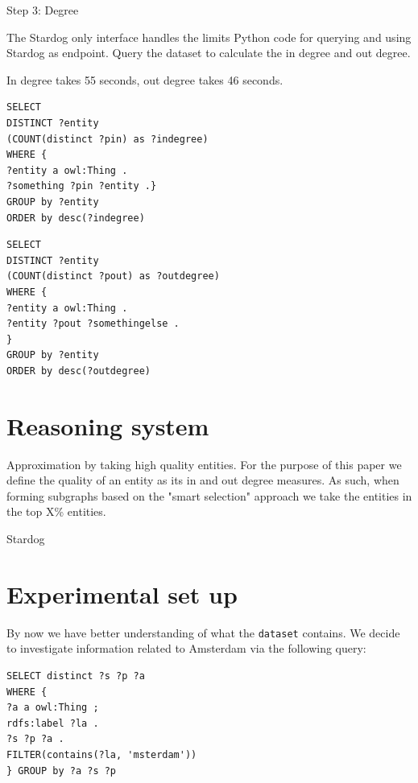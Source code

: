 \documentclass[runningheads,a4paper]{../../StyleFiles/llncs}
\begin{document}
Step 3: Degree

The Stardog only interface handles the limits 
Python code for querying and using Stardog as endpoint. 
Query the dataset to calculate the in degree and out degree.

In degree takes 55 seconds, out degree takes 46 seconds.

\begin{lstlisting}[captionpos=b, caption=SPARQL query for calculating in degree of entities, label=lst:sparql, basicstyle=\ttfamily\small,frame=bt]
SELECT
DISTINCT ?entity
(COUNT(distinct ?pin) as ?indegree)
WHERE { 
?entity a owl:Thing .
?something ?pin ?entity .}
GROUP by ?entity
ORDER by desc(?indegree)
\end{lstlisting}

\begin{lstlisting}[captionpos=b, caption=SPARQL query for calculating out degree of entities, label=lst:sparql, basicstyle=\ttfamily\small,frame=bt]
SELECT
DISTINCT ?entity
(COUNT(distinct ?pout) as ?outdegree)
WHERE { 
?entity a owl:Thing .
?entity ?pout ?somethingelse .
}
GROUP by ?entity
ORDER by desc(?outdegree)
\end{lstlisting}

\section{Reasoning system}
Approximation by taking high quality entities. For the purpose of this paper we define the quality of an entity as its in and out degree measures. As such, when forming subgraphs based on the "smart selection" approach we take the entities in the top X\% entities.

Stardog

\section{Experimental set up}
By now we have better understanding of what the \texttt{dataset} contains. We decide to investigate information related to Amsterdam via the following query:

\begin{lstlisting}[captionpos=b, caption=SPARQL query for calculating out degree of entities, label=lst:sparql, basicstyle=\ttfamily\small,frame=bt]
SELECT distinct ?s ?p ?a
WHERE { 
?a a owl:Thing ;
rdfs:label ?la .
?s ?p ?a .
FILTER(contains(?la, 'msterdam'))
} GROUP by ?a ?s ?p
\end{lstlisting}
\end{document}
